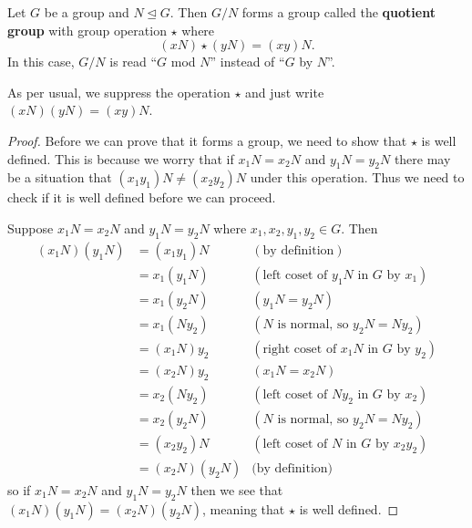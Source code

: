 \begin{theorem}\label{thrm-quotient-group-requirement}
    Let $G$ be a group and $N \unlhd G$. Then $G / N$ forms a group called the \textbf{quotient group} with group operation $\star$ where
    \[
        (xN) \star (yN) = (xy)N.
    \]
    In this case, $G / N$ is read ``$G$ mod $N$'' instead of ``$G$ by $N$''.
\end{theorem}
\begin{remark}
    As per usual, we suppress the operation $\star$ and just write $(xN)(yN) = (xy)N$.
\end{remark}
\begin{proof}
    Before we can prove that it forms a group, we need to show that $\star$ is well defined. This is because we worry that if $x_1N = x_2N$ and $y_1N = y_2N$ there may be a situation that $(x_1y_1)N \neq (x_2y_2)N$ under this operation. Thus we need to check if it is well defined before we can proceed.

    Suppose $x_1N = x_2N$ and $y_1N = y_2N$ where $x_1, x_2, y_1, y_2 \in G$. Then
    \begin{align*}
        (x_1N)(y_1N) &= (x_1y_1)N & (\text{by definition})\\
        &= x_1(y_1N) & (\text{left coset of } y_1N \text{ in } G \text{ by } x_1)\\
        &= x_1(y_2N) & (y_1N = y_2N)\\
        &= x_1(Ny_2) & (N \text{ is normal, so } y_2N=Ny_2)\\
        &= (x_1N)y_2 & (\text{right coset of } x_1N \text{ in } G \text{ by } y_2)\\
        &= (x_2N)y_2 & (x_1N = x_2N)\\
        &= x_2(Ny_2) & (\text{left coset of } Ny_2 \text{ in } G \text{ by } x_2)\\
        &= x_2(y_2N) & (N \text{ is normal, so } y_2N=Ny_2)\\
        &= (x_2y_2)N & (\text{left coset of } N \text{ in } G \text{ by } x_2y_2)\\
        &= (x_2N)(y_2N) & \text{(by definition)}
    \end{align*}
    so if $x_1N = x_2N$ and $y_1N = y_2N$ then we see that $(x_1N)(y_1N) = (x_2N)(y_2N)$, meaning that $\star$ is well defined.


\end{proof}
